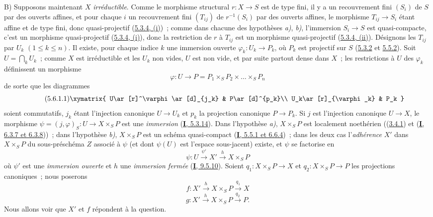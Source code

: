 B) Supposons maintenant $X$ \emph{irréductible}. Comme le morphisme structural
$r:X\to S$ est de type fini, il y a un recouvrement fini $(S_i)$ de $S$ par
des ouverts affines, et pour chaque $i$ un recouvrement fini $(T_{ij})$ de
$r^{-1}(S_i)$ par des ouverts affines, le morphisme $T_{ij}\to S_i$ étant
affine et de type fini, donc quasi-projectif
(\hyperref[II.5.3.4-fr]{5.3.4, (i)})~; comme dans chacune des hypothèses \emph{a)},
\emph{b)}, l'immersion $S_i\to S$ est quasi-compacte, c'est un morphisme
quasi-projectif (\hyperref[II.5.3.4-fr]{5.3.4, (i)}), donc la restriction de
$r$ à $T_{ij}$ est un morphisme quasi-projectif
(\hyperref[II.5.3.4-fr]{5.3.4, (ii)}). Désignons les $T_{ij}$ par $U_k$
$(1\leq k\leq n)$. Il existe, pour chaque indice $k$ une immersion ouverte
$\varphi_k:U_k\to P_k$, où $P_k$ est projectif sur $S$
(\hyperref[II.5.3.2-fr]{5.3.2} et \hyperref[II.5.5.2-fr]{5.5.2}). Soit
$U=\bigcap_kU_k$~; comme $X$ est irréductible et les $U_k$ non vides, $U$ est
non vide, et par suite partout dense dans $X$~; les restrictions à $U$ des
$\varphi_k$ définissent un morphisme
\[
\varphi:U\to P=P_1\times_SP_2\times\ldots\times_SP_n
\]
de sorte que les diagrammes
\[
\tag{5.6.1.1}
\label{II.5.6.1.1-fr}
\xymatrix{
U\ar[r]^\varphi\ar[d]_{j_k} & P\ar[d]^{p_k}\\
U_k\ar[r]_{\varphi_k} & P_k
}
\]
soient commutatifs, $j_k$ étant l'injection canonique $U\to U_k$ et $p_k$ la
projection canonique $P\to P_k$. Si $j$ est l'injection canonique $U\to X$,
le morphisme $\psi=(j,\varphi)_S:U\to X\times_SP$ est une \emph{immersion}
(\hyperref[I.5.3.14-fr]{\textbf{I}, 5.3.14}). Dans l'hypothèse \emph{a)}, $X\times_SP$ est
localement noethérien ((\hyperref[II.3.4.1-fr]{3.4.1}) et
(\hyperref[I.6.3.7-fr]{\textbf{I}, 6.3.7 et 6.3.8}))~; dans l'hypothèse \emph{b)},
$X\times_SP$ est un schéma quasi-compact
(\hyperref[I.5.5.1-fr]{\textbf{I}, 5.5.1 et 6.6.4})~; dans les deux cas l'\emph{adhérence}
$X'$ dans $X\times_SP$ du sous-préschéma $Z$ associé à $\psi$ (et dont
$\psi(U)$ est l'espace sous-jacent) existe, et $\psi$ se factorise en
\[
\tag{5.6.1.2}
\label{II.5.6.1.2-fr}
\psi:U\xrightarrow{\psi'}X'\xrightarrow{h}X\times_SP
\]
où $\psi'$ est une \emph{immersion ouverte} et $h$ une \emph{immersion fermée}
(\hyperref[I.9.5.10-fr]{\textbf{I}, 9.5.10}). Soient
$q_1:X\times_SP\to X$ et $q_2:X\times_SP\to P$ les projections canoniques~;
nous poserons
\[
\tag{5.6.1.3}
\label{II.5.6.1.3-fr}
f:X'\xrightarrow{h}X\times_SP\xrightarrow{q_1}X
\]
\[
\tag{5.6.1.4}
\label{II.5.6.1.4-fr}
g:X'\xrightarrow{h}X\times_SP\xrightarrow{q_2}P.
\]
Nous allons voir que $X'$ et $f$ répondent à la question.

